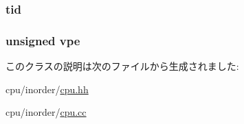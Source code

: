 \label{classInOrderCPU_1_1CPUEvent_a0bbcec1ffea6f107bb549f4c623683f1}
\hypertarget{classInOrderCPU_1_1CPUEvent_aa508770268ee4ceaf16054b9e0be0e17}{
\subsubsection[{tid}]{ {\bf tid}}}
\label{classInOrderCPU_1_1CPUEvent_aa508770268ee4ceaf16054b9e0be0e17}
\hypertarget{classInOrderCPU_1_1CPUEvent_a7da7803c689c7ae0b8e8b2cb5efcd8c2}{
\subsubsection[{vpe}]{\setlength{\rightskip}{0pt plus 5cm}unsigned {\bf vpe}}}
\label{classInOrderCPU_1_1CPUEvent_a7da7803c689c7ae0b8e8b2cb5efcd8c2}


このクラスの説明は次のファイルから生成されました:\begin{DoxyCompactItemize}
\item 
cpu/inorder/\hyperlink{inorder_2cpu_8hh}{cpu.hh}\item 
cpu/inorder/\hyperlink{inorder_2cpu_8cc}{cpu.cc}\end{DoxyCompactItemize}
